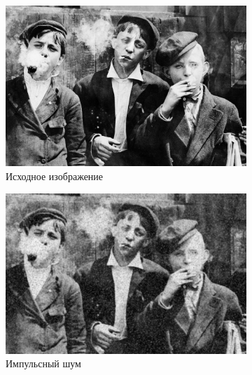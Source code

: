   \begin{figure}[ht] 
    \centering
    \begin{subfigure}[b]{0.5\linewidth}
        \centering
        \includegraphics[width=0.95\linewidth]{../lewis-hine-taschen-main-3.jpg} 
        \caption{Исходное изображение} 
        \label{gaussian_7:a} 
        \vspace{4ex}
    \end{subfigure}%
    \begin{subfigure}[b]{0.5\linewidth}
      \centering
      \includegraphics[width=0.95\linewidth]{../Gaussian_Blur/Gaussian_Blur_Impulse_noise_(7,7).jpg} 
      \caption{Импульсный шум} 
      \label{gaussian_7:b} 
      \vspace{4ex}
    \end{subfigure}
    \begin{subfigure}[b]{0.5\linewidth}
      \centering

\end{subfigure}
\end{figure}
